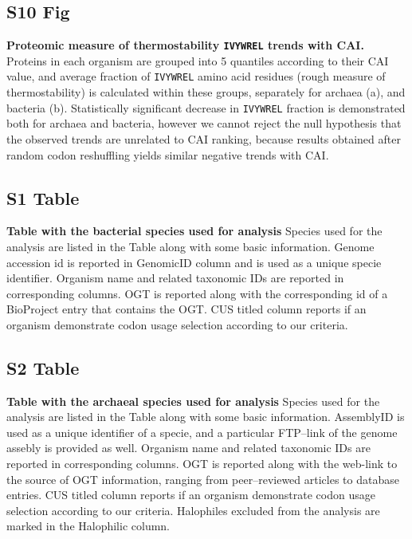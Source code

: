 \documentclass[10pt,letterpaper]{article}
\begin{document}
\subsection*{S10 Fig}
\label{fig:s10}
{\bf Proteomic measure of thermostability \texttt{IVYWREL} trends with CAI.}
Proteins in each organism are grouped into 5 quantiles according to their CAI value, and average fraction of \texttt{IVYWREL} amino acid residues (rough measure of thermostability) is calculated within these groups, separately for archaea (a), and bacteria (b). Statistically significant decrease in \texttt{IVYWREL} fraction is demonstrated both for archaea and bacteria, however we cannot reject the null hypothesis that the observed trends are unrelated to CAI ranking, because results obtained after random codon reshuffling yields similar negative trends with CAI.




\subsection*{S1 Table}
\label{table:s1}
{\bf Table with the bacterial species used for analysis}
Species used for the analysis are listed in the Table along with some basic information.
Genome accession id is reported in GenomicID column and is used as a unique specie identifier.
Organism name and related taxonomic IDs are reported in corresponding columns.
OGT is reported along with the corresponding id of a BioProject entry that contains the OGT.
CUS titled column reports if an organism demonstrate codon usage selection according to our criteria.


\subsection*{S2 Table}
\label{table:s2}
{\bf Table with the archaeal species used for analysis}
Species used for the analysis are listed in the Table along with some basic information.
AssemblyID is used as a unique identifier of a specie, and a particular FTP--link of the genome assebly is provided as well.
Organism name and related taxonomic IDs are reported in corresponding columns. OGT is reported along with the web-link to the source of OGT information, ranging from peer--reviewed articles to database entries. CUS titled column reports if an organism demonstrate codon usage selection according to our criteria. Halophiles excluded from the analysis are marked in the Halophilic column.
\end{document}
